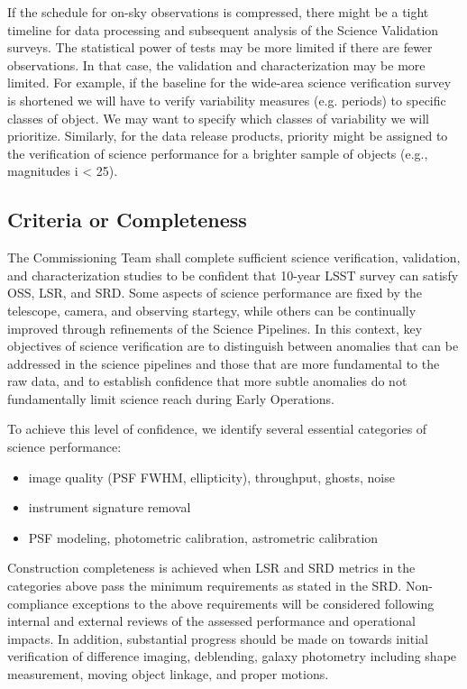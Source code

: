 If the schedule for on-sky observations is compressed, there might be a tight timeline for data processing and subsequent analysis of the Science Validation surveys. The statistical power of tests may be more limited if there are fewer observations. In that case, the validation and characterization may be more limited. For example, if the baseline for the wide-area science verification survey is shortened we will have to verify variability measures (e.g. periods) to specific classes of object. We may want to specify which classes of variability we will prioritize. Similarly, for the data release products, priority might be assigned to the verification of science performance for a brighter sample of objects (e.g., magnitudes i < 25).

\subsection{Criteria or Completeness}
The Commissioning Team shall complete sufficient science verification, validation, and characterization studies to be confident that 10-year LSST survey can satisfy OSS, LSR, and SRD. Some aspects of science performance are fixed by the telescope, camera, and observing startegy, while others can be continually improved through refinements of the Science Pipelines. In this context, key objectives of science verification are to distinguish between anomalies that can be addressed in the science pipelines and those that are more fundamental to the raw data, and to establish confidence that more subtle anomalies do not fundamentally limit science reach during Early Operations.

To achieve this level of confidence, we identify several essential categories of science performance:

\begin{itemize}

	\item image quality (PSF FWHM, ellipticity), throughput, ghosts, noise
	\item instrument signature removal
	\item PSF modeling, photometric calibration, astrometric calibration
	
\end{itemize}

Construction completeness is achieved when LSR and SRD metrics in the categories above pass the minimum requirements as stated in the SRD. Non-compliance exceptions to the above requirements will be considered following internal and external reviews of the assessed performance and operational impacts.
In addition, substantial progress should be made on towards initial verification of difference imaging, deblending, galaxy photometry including shape measurement, moving object linkage, and proper motions.


